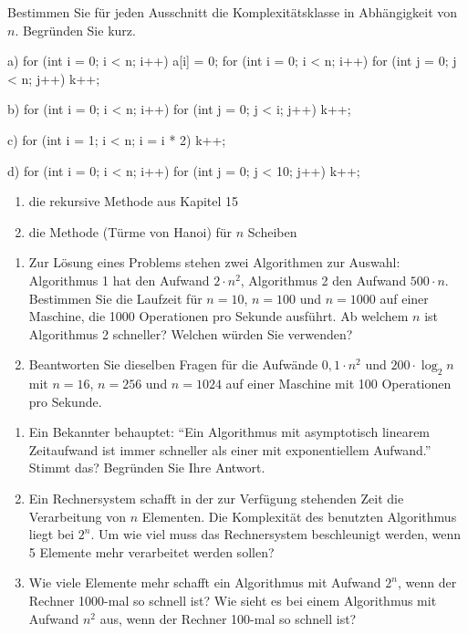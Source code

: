 Bestimmen Sie für jeden Ausschnitt die Komplexitätsklasse in Abhängigkeit von $n$. Begründen Sie kurz.
\begin{tcbraster}[raster columns=2, raster equal height=rows, raster column skip=3mm, raster row skip=1mm]
\begin{javacode}[Ausschnitt]{a)}
for (int i = 0; i < n; i++) {
	a[i] = 0;
}
for (int i = 0; i < n; i++) {
	for (int j = 0; j < n; j++) {
		k++;
	}
}
\end{javacode}
\begin{javacode}[Ausschnitt]{b)}
for (int i = 0; i < n; i++) {
	for (int j = 0; j < i; j++) {
		k++;
	}
}
\end{javacode}
\begin{javacode}[Ausschnitt]{c)}
for (int i = 1; i < n; i = i * 2) {
	k++;
}
\end{javacode}
\begin{javacode}[Ausschnitt]{d)}
for (int i = 0; i < n; i++) {
	for (int j = 0; j < 10; j++) {
		k++;
	}
}
\end{javacode}
\end{tcbraster}
\begin{enumerate}[label=\alph*), start=5]
\item die rekursive Methode  aus Kapitel 15
\item die Methode  (Türme von Hanoi) für $n$ Scheiben
\end{enumerate}

\begin{enumerate}[label=\alph*)]
\item Zur Lösung eines Problems stehen zwei Algorithmen zur Auswahl: Algorithmus 1 hat den Aufwand $2 \cdot n^2$, Algorithmus 2 den Aufwand $500 \cdot n$. Bestimmen Sie die Laufzeit für $n = 10$, $n = 100$ und $n = 1000$ auf einer Maschine, die 1000 Operationen pro Sekunde ausführt. Ab welchem $n$ ist Algorithmus 2 schneller? Welchen würden Sie verwenden?
\item Beantworten Sie dieselben Fragen für die Aufwände $0{,}1 \cdot n^2$ und $200 \cdot \log_2 n$ mit $n = 16$, $n = 256$ und $n = 1024$ auf einer Maschine mit 100 Operationen pro Sekunde.
\end{enumerate}

\begin{enumerate}[label=\alph*)]
\item Ein Bekannter behauptet: \enquote{Ein Algorithmus mit asymptotisch linearem Zeitaufwand ist immer schneller als einer mit exponentiellem Aufwand.} Stimmt das? Begründen Sie Ihre Antwort.
\item Ein Rechnersystem schafft in der zur Verfügung stehenden Zeit die Verarbeitung von $n$ Elementen. Die Komplexität des benutzten Algorithmus liegt bei $2^n$. Um wie viel muss das Rechnersystem beschleunigt werden, wenn 5 Elemente mehr verarbeitet werden sollen?
\item Wie viele Elemente mehr schafft ein Algorithmus mit Aufwand $2^n$, wenn der Rechner 1000-mal so schnell ist? Wie sieht es bei einem Algorithmus mit Aufwand $n^2$ aus, wenn der Rechner 100-mal so schnell ist?
\end{enumerate}

